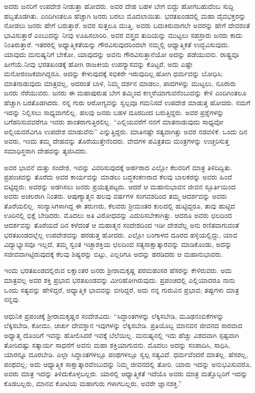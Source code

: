 ಅವರು ಜನರಿಗೆ ಉಪದೇಶ ನೀಡುತ್ತಾ ಹೋದರು. ಅವರ ದೇಹ ಬಹಳ ಬೇಗ ಬಿದ್ದು ಹೋಗಬಹುದೆಂಬ ಸುದ್ದಿ ಹಬ್ಬತೊಡಗಿತು. ಎಂದಿಗಿಂತಲೂ ಹೆಚ್ಚಾಗಿ ಜನರು ಬರಲು ಮೊದಲಾಯಿತು. ಭರತಖಂಡದಲ್ಲಿ ಮಹಾ ದೈವಭಕ್ತರನ್ನು ನೋಡಲು ಜನರು ಹೇಗೆ ಬರುತ್ತಾರೆ. ಅವರ ಸುತ್ತಲೂ ಮುತ್ತಿ, ಅವರು ಬದುಕಿರುವಾಗಲೇ ಅವರನ್ನು ಹೇಗೆ ದೇವರಂತೆ ಭಾವಿಸುತ್ತಾರೆ ಎಂಬುದನ್ನು ನೀವು ಊಹಿಸಲಾರಿರಿ. ಅವರ ವಸ್ತ್ರದ ತುದಿಯನ್ನು ಮುಟ್ಟಲು ಸಹಸ್ರಾರು ಜನರು ಕಾದು ನಿಂತಿರುತ್ತಾರೆ. ಇತರರಲ್ಲಿ ಅಧ್ಯಾತ್ಮಿಕತೆಯನ್ನು ಗೌರವಿಸುವುದರಿಂದಲೇ ನಮ್ಮಲ್ಲಿ ಆಧ್ಯಾತ್ಮಿಕತೆ ಉದ್ಭವಿಸುವುದು. ಯಾವುದು ಮನುಷ್ಯನಿಗೆ ಬೇಕೋ, ಯಾವುದನ್ನು ಅವನು ಗೌರವಿಸುತ್ತಾನೆಯೋ ಅದನ್ನು ಪಡೆಯುವನು. ರಾಷ್ಟ್ರವೂ ಹೀಗೆಯೆ.ನೀವು ಭರತಖಂಡಕ್ಕೆ ಹೋಗಿ ರಾಜಕೀಯ ಉಪನ್ಯಾಸವನ್ನು ಕೊಟ್ಟರೆ, ಅದು ಎಷ್ಟೇ ಮನೋರಂಜಕವಾಗಿದ್ದರೂ, ಅದನ್ನು ಕೇಳುವುದಕ್ಕೆ ಸಭಿಕರೇ ಇರುವುದಿಲ್ಲ.ಹೋಗಿ ಧರ್ಮವನ್ನು ಬೋಧಿಸಿ; ಮಾತನಾಡುವುದು ಮಾತ್ರವಲ್ಲ, ಅದರಂತೆ ಬಾಳಿ, ನಿಮ್ಮ ದರ್ಶನ ಮಾಡಲು, ಪಾದಗಳನ್ನು ಮುಟ್ಟಲು, ನೂರಾರು ಜನರು ನೆರೆಯುವರು. ಜನರು ಈ ಮಹಾಪುರುಷ ಬೇಗ ತಮ್ಮಿಂದ ಕಣ್ಮರೆಯಾಗುವನೆಂಬುದನ್ನು ಕೇಳಿ ಎಂದಿಗಿಂತಲೂ ಹೆಚ್ಚಾಗಿ ಬರತೊಡಗಿದರು. ನನ್ನ ಗುರು ಆರೋಗ್ಯವನ್ನು ಸ್ವಲ್ಪವೂ ಗಮನಿಸದೆ ಉಪದೇಶ ಮಾಡುತ್ತ ಹೋದರು. ನಮಗೆ ಇದನ್ನು ನಿಲ್ಲಿಸಲು ಸಾಧ್ಯವಾಗಲಿಲ್ಲ. ಹಲವು ಜನರು ಬಹಳ ದೂರದಿಂದ ಬರುತ್ತಿದ್ದರು. ಅವರ ಪ್ರಶ್ನೆಗಳನ್ನು ಬಗೆಹರಿಸುವವರೆಗೂ ಇವರು ಶಾಂತರಾಗುತ್ತಿರಲಿಲ್ಲ. “ಎಲ್ಲಿಯವರೆಗೆ ನನಗೆ ಮಾತನಾಡುವುದು ಸಾಧ್ಯವೋ ಅಲ್ಲಿಯವರೆವಿಗೂ ಉಪದೇಶ ಮಾಡುವೆನು” ಎನ್ನುತ್ತಿದ್ದರು. ಮಾತಿನಷ್ಟೇ ಸತ್ಯವಾಗಿತ್ತು ಅವರ ನಡವಳಿಕೆ. ಒಂದು ದಿನ ಅವರು, ಇಂದು ತಮ್ಮ ದೇಹವನ್ನು ತೊರೆಯುತ್ತೇನೆಂದರು. ವೇದಗಳ ಪವಿತ್ರತಮ ಮಂತ್ರಗಳನ್ನು ಉಚ್ಚರಿಸುತ್ತ ಸಮಾಧಿಸ್ಥರಾಗಿ ದೇಹವನ್ನು ತ್ಯಜಿಸಿದರು.

ಅವರ ಭಾವನೆ ಮತ್ತು ಸಂದೇಶ, ಇವನ್ನು ವಿವರಿಸುವುದಕ್ಕೆ ಅರ್ಹರಾದ ಎಲ್ಲೋ ಕೆಲವರಿಗೆ ಮಾತ್ರ ತಿಳಿದಿದ್ದಿತು. ಪ್ರಪಂಚವನ್ನು ತೊರೆದು ಅವರ ಕಾರ್ಯವನ್ನು ಮಾಡಲು ಬದ್ಧಕಂಕಣರಾದ ಕೆಲವು ಬಾಲಕರನ್ನು ಅವರು ಹಿಂದೆ ಬಿಟ್ಟಿದ್ದರು; ಅವರನ್ನು ಅಡಗಿಸಲು ಜನರು ಪ್ರಯತ್ನಪಟ್ಟರು. ಆದರೆ ಆ ಮಹಾನುಭಾವನ ಜೀವನ ಸ್ಫೂರ್ತಿಯಿಂದ ಅವರು ಅಚಲರಾಗಿ ನಿಂತರು. ಆಪುಣ್ಯಾತ್ಮನ ಹಲವು ವರ್ಷಗಳ ಸಂಗವಶದಿಂದ ತಮ್ಮ ಆದರ್ಶವನ್ನು ಅವರು ತೊರೆಯಲಿಲ್ಲ. ಸಂನ್ಯಾಸಿಗಳಾಗಿದ್ದ ಈ ತರುಣರು, ಕೆಲವರು ಶ‍್ರೀಮಂತರ ಕುಲದಲ್ಲಿ ಹುಟ್ಟಿದ್ದರೂ, ತಾವು ಹುಟ್ಟಿದ ಊರಿನಲ್ಲಿ ಭಿಕ್ಷೆ ಬೇಡಿದರು. ಮೊದಲು ಅತಿ ವಿರೋಧವನ್ನು ಎದುರಿಸಬೇಕಾಗಿತ್ತು. ಆದರೂ ಅವರು ಛಲದಿಂದ ಆದರ್ಶವನ್ನು ತೊರೆಯದೆ ದಿನ ಕಳೆದಂತೆ ಆ ಮಹಾತ್ಮನ ಸಂದೇಶದಿಂದ ಇಡೀ ದೇಶವೆಲ್ಲ ಅನು ರಣಿತವಾಗುವಂತೆ ಭರತಖಂಡದಲ್ಲೆಲ್ಲ ಉಪದೇಶವನ್ನು ಹರಡುತ್ತ ಹೋದರು. ಎಲ್ಲೋ ಬಂಗಾಳದ ದೂರದ ಹಳ್ಳಿಯಲ್ಲಿದ್ದು, ಯಾವ ವಿದ್ಯಾಭ್ಯಾಸವೂ ಇಲ್ಲದೆ, ತಮ್ಮ ಸ್ವಂತ ಇಚ್ಛಾಶಕ್ತಿಯ ಛಲದಿಂದ ಸತ್ಯಸಾಕ್ಷಾತ್ಕಾರವನ್ನು ಮಾಡಿಕೊಂಡು, ಅದನ್ನು ಸಜೀವವಾಗಿಟ್ಟಿರುವುದಕ್ಕೆ ಕೆಲವು ಶಿಷ್ಯರನ್ನು ಬಿಟ್ಟು, ಎಲ್ಲರಿಗೂ ಅದನ್ನು ಹರಡಿದರು ಆ ಮಹಾನುಭಾವರು.

ಇಂದು ಭರತಖಂಡದಲ್ಲಿರುವ ಲಕ್ಷಾಂತರ ಜನರು ಶ‍್ರೀರಾಮಕೃಷ್ಣ ಪರಮಹಂಸರ ಹೆಸರನ್ನು ಕೇಳಿರುವರು. ಅದು ಮಾತ್ರವಲ್ಲ ಅವರ ಶಕ್ತಿ ಪ್ರಭಾವ ಭರತಖಂಡವನ್ನು ಮೀರಿಹೋಗಿರುವುದು. ಪ್ರಪಂಚದಲ್ಲಿ ಎಲ್ಲಿಯಾದರೂ ನಾನು ಒಂದು ಸತ್ಯವನ್ನು ಹೇಳಿದ್ದರೆ, ಆಧ್ಯಾತ್ಮಿಕ ಭಾವವನ್ನು ಬೀರಿದ್ದರೆ, ಅದು ನನ್ನ ಗುರುವಿನ ಪ್ರಭಾವ; ತಪ್ಪುಗಳು ಮಾತ್ರ ನನ್ನವು.

ಆಧುನಿಕ ಪ್ರಪಂಚಕ್ಕೆ ಶ‍್ರೀರಾಮಕೃಷ್ಣರ ಸಂದೇಶವಿದು: “ಸಿದ್ಧಾಂತಗಳನ್ನು ಲೆಕ್ಕಿಸಬೇಡಿ, ಮೂಢನಂಬಿಕೆಗಳನ್ನು ಲೆಕ್ಕಿಸಬೇಡಿ, ಕೋಮು, ಚರ್ಚು ದೇವಸ್ಥಾನ ಇವುಗಳನ್ನು ಲೆಕ್ಕಿಸಬೇಡಿ. ಪ್ರತಿಯೊಬ್ಬ ಮಾನವನ ಜೀವನದ ಸಾರವಾದ ಅಧ್ಯಾತ್ಮ ದೊಂದಿಗೆ ಇವನ್ನು ಹೋಲಿಸಿದರೆ ಇವಕ್ಕೆ ಬೆಲೆಯಿಲ್ಲ. ಮನುಷ್ಯನಲ್ಲಿ ಇದು ಹೆಚ್ಚು ವಿಶದವಾಗಿ ಸ್ಪಷ್ಟವಾಗಿ ತೋರಿದಷ್ಟು ಸತ್ಕಾರ್ಯ ಸಾಧನೆಗೆ ಅವನು ಮಹಾ ಶಕ್ತಿಯಾಗುವನು. ಮೊದಲು ಅದನ್ನು ಸಂಪಾದಿಸಿ, ಸಾಧಿಸಿ, ಯಾರನ್ನೂ ದೂರಬೇಡಿ. ಎಲ್ಲಾ ಸಿದ್ಧಾಂತಗಳಲ್ಲೂ ಪಂಥಗಳಲ್ಲೂ ಸ್ವಲ್ಪ ಸತ್ಯವಿದೆ. ಧರ್ಮವೆಂದರೆ ಮಾತಲ್ಲ. ಹೆಸರಲ್ಲ, ಪಂಥವಲ್ಲ; ಅದು ಆಧ್ಯಾತ್ಮಿಕ ಸಾಕ್ಷಾತ್ಕಾರವೆಂಬುದನ್ನು ನಿಮ್ಮ ಜೀವನದಲ್ಲಿ ತೋರಿ. ಯಾರು ಇದನ್ನು ಅನುಭವಿಸುವರೊ, ಅವರು ಮಾತ್ರ ಇದನ್ನು ತಿಳಿದುಕೊಳ್ಳಬಲ್ಲರು. ಯಾರಲ್ಲಿ ಆಧ್ಯಾತ್ಮಿಕತೆ ಇದೆಯೊ ಅವರು ಮಾತ್ರ ಮತ್ತೊಬ್ಬರಿಗೆ ಇದನ್ನು ಕೊಡಬಲ್ಲರು, ಮಾನವ ಕೋಟಿಯ ಮಹಾಗುರು ಗಳಾಗಬಲ್ಲರು, ಅವರೇ ಜ್ಞಾನಶಕ್ತಿ.”

